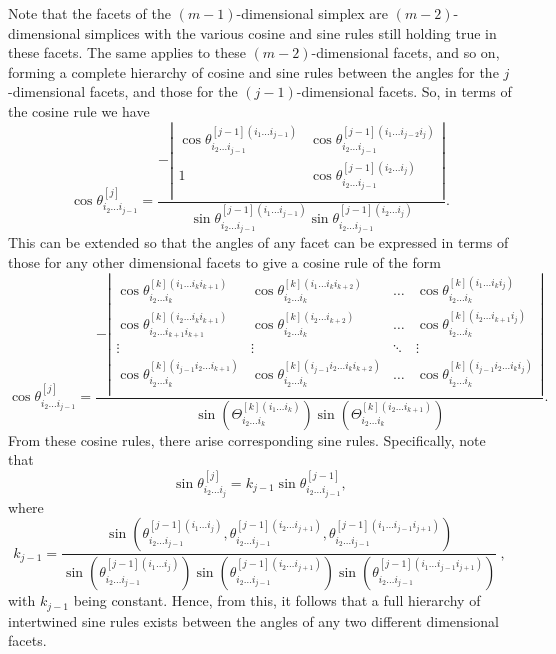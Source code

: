 \documentclass[fleqn,11pt,twoside]{article}
\theoremstyle{definition}
\begin{document}
Note that the facets of the $(m-1)$-dimensional simplex are $(m-2)$-dimensional simplices with the various cosine and sine rules still holding true in these facets. The same applies to these $(m-2)$-dimensional facets, and so on, forming a  complete hierarchy of cosine and sine rules between the angles for the $j$-dimensional facets, and those for the $(j-1)$-dimensional facets. So, in terms of the cosine rule we have
\begin{equation}
\cos\theta^{[j]}_{i_2\dots i_{j-1}}=\frac{-\left|\begin{array}{cc}
\cos\theta^{[j-1](i_1\dots i_{j-1})}_{i_2\dots i_{j-1}} & \cos\theta^{[j-1](i_1\dots i_{j-2}i_j)}_{i_2\dots i_{j-1}}\\
1 & \cos\theta^{[j-1](i_2\dots i_{j})}_{i_2\dots i_{j-1}}\\
\end{array}\right|}
{\sin\theta^{[j-1](i_1\dots i_{j-1})}_{i_2\dots i_{j-1}}\sin\theta^{[j-1](i_2\dots i_{j})}_{i_2\dots i_{j-1}}}.
\end{equation}
This can be extended so that the angles of any facet can be expressed in terms of those for any other dimensional facets to give a cosine rule of the form
\begin{equation}
\cos\theta^{[j]}_{i_2\dots i_{j-1}}=\frac{-\left|\begin{array}{cccc}
\cos\theta^{[k](i_1\dots i_ki_{k+1})}_{i_2\dots i_k} & \cos\theta^{[k](i_1\dots i_ki_{k+2})}_{i_2\dots i_k} & \dots &\cos\theta^{[k](i_1\dots i_ki_{j})}_{i_2\dots i_k}\\
\cos\theta^{[k](i_2\dots i_ki_{k+1})}_{i_2\dots i_{k+1}i_{k+1}} & \cos\theta^{[k](i_2\dots i_{k+2})}_{i_2\dots i_k} & \dots &\cos\theta^{[k](i_2\dots i_{k+1}i_{j})}_{i_2\dots i_k}\\
\vdots & \vdots &\ddots & \vdots\\
\cos\theta^{[k](i_{j-1}i_2\dots i_{k+1})}_{i_2\dots i_k} & \cos\theta^{[k](i_{j-1}i_2\dots i_ki_{k+2})}_{i_2\dots i_k} & \dots &\cos\theta^{[k](i_{j-1}i_2\dots i_ki_{j})}_{i_2\dots i_k}\\
\end{array}\right|}
{\sin\left(\Theta^{[k](i_1\dots i_k)}_{i_2\dots i_k}\right)\sin\left(\Theta^{[k](i_2\dots i_{k+1})}_{i_2 \dots i_k}\right)}.
\end{equation}
From these cosine rules, there arise corresponding sine rules. Specifically, note that
\begin{equation}
\sin\theta^{[j]}_{i_2\dots i_{j}}=k_{j-1}\sin\theta^{[j-1]}_{i_2\dots i_{j-1}},
\end{equation}
where
\begin{equation}
k_{j-1}=\frac{\sin\left(\theta^{[j-1](i_1\dots i_j)}_{i_2\dots i_{j-1}},\theta^{[j-1](i_2\dots i_{j+1})}_{i_2\dots i_{j-1}},\theta^{[j-1](i_1\dots i_{j-1}i_{j+1})}_{i_2\dots i_{j-1}}
\right)}{\sin\left(\theta^{[j-1](i_1\dots i_j)}_{i_2\dots i_{j-1}}\right)\sin\left(\theta^{[j-1](i_2\dots i_{j+1})}_{i_2\dots i_{j-1}}\right)\sin\left(\theta^{[j-1](i_1\dots i_{j-1}i_{j+1})}_{i_2\dots i_{j-1}}\right)}\ ,
\end{equation}
with $k_{j-1}$ being constant. Hence, from this, it follows that a full hierarchy of intertwined sine rules exists between the angles of any two different dimensional facets.
\end{document}
